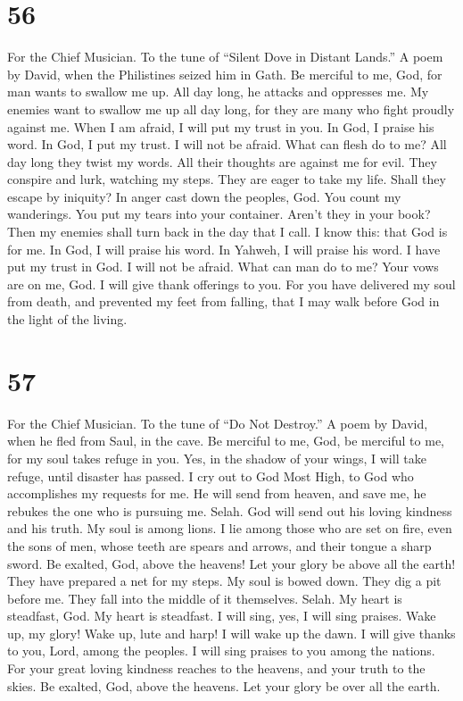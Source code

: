 \hypertarget{section-54}{%
\section{56}\label{section-54}}

For the Chief Musician. To the tune of ``Silent Dove in Distant Lands.''
A poem by David, when the Philistines seized him in Gath. 
Be merciful to me, God, for man wants to swallow me up. All day long, he
attacks and oppresses me.  My enemies want to swallow me up
all day long, for they are many who fight proudly against me.
 When I am afraid, I will put my trust in you. 
In God, I praise his word. In God, I put my trust. I will not be afraid.
What can flesh do to me?  All day long they twist my words.
All their thoughts are against me for evil.  They conspire
and lurk, watching my steps. They are eager to take my life.
 Shall they escape by iniquity? In anger cast down the
peoples, God.  You count my wanderings. You put my tears
into your container. Aren't they in your book?  Then my
enemies shall turn back in the day that I call. I know this: that God is
for me.  In God, I will praise his word. In Yahweh, I will
praise his word.  I have put my trust in God. I will not be
afraid. What can man do to me?  Your vows are on me, God. I
will give thank offerings to you.  For you have delivered
my soul from death, and prevented my feet from falling, that I may walk
before God in the light of the living.

\hypertarget{section-55}{%
\section{57}\label{section-55}}

For the Chief Musician. To the tune of ``Do Not Destroy.'' A poem by
David, when he fled from Saul, in the cave.  Be merciful to
me, God, be merciful to me, for my soul takes refuge in you. Yes, in the
shadow of your wings, I will take refuge, until disaster has passed.
 I cry out to God Most High, to God who accomplishes my
requests for me.  He will send from heaven, and save me, he
rebukes the one who is pursuing me. Selah. God will send out his loving
kindness and his truth.  My soul is among lions. I lie among
those who are set on fire, even the sons of men, whose teeth are spears
and arrows, and their tongue a sharp sword.  Be exalted,
God, above the heavens! Let your glory be above all the earth!
 They have prepared a net for my steps. My soul is bowed
down. They dig a pit before me. They fall into the middle of it
themselves. Selah.  My heart is steadfast, God. My heart is
steadfast. I will sing, yes, I will sing praises.  Wake up,
my glory! Wake up, lute and harp! I will wake up the dawn. 
I will give thanks to you, Lord, among the peoples. I will sing praises
to you among the nations.  For your great loving kindness
reaches to the heavens, and your truth to the skies.  Be
exalted, God, above the heavens. Let your glory be over all the earth.

